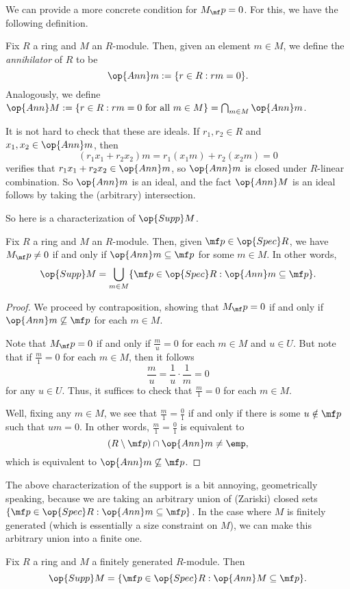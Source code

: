 We can provide a more concrete condition for $M_\mf p=0$. For this, we have the following definition.
\begin{definition}[Annihilator]
	Fix $R$ a ring and $M$ an $R$-module. Then, given an element $m\in M$, we define the \textit{annihilator} of $R$ to be
	\[\op{Ann}m:=\{r\in R:rm=0\}.\]
	Analogously, we define $\op{Ann}M:=\{r\in R:rm=0\text{ for all }m\in M\}=\bigcap_{m\in M}\op{Ann}m$.
\end{definition}
\begin{remark}
	It is not hard to check that these are ideals. If $r_1,r_2\in R$ and $x_1,x_2\in\op{Ann}m$, then
	\[(r_1x_1+r_2x_2)m=r_1(x_1m)+r_2(x_2m)=0\]
	verifies that $r_1x_1+r_2x_2\in\op{Ann}m$, so $\op{Ann}m$ is closed under $R$-linear combination. So $\op{Ann}m$ is an ideal, and the fact $\op{Ann}M$ is an ideal follows by taking the (arbitrary) intersection.
\end{remark}
So here is a characterization of $\op{Supp}M$.
\begin{proposition} \label{prop:generalsupport}
	Fix $R$ a ring and $M$ an $R$-module. Then, given $\mf p\in\op{Spec}R$, we have $M_\mf p\ne0$ if and only if $\op{Ann}m\subseteq\mf p$ for some $m\in M$. In other words,
	\[\op{Supp}M=\bigcup_{m\in M}\{\mf p\in\op{Spec}R:\op{Ann}m\subseteq\mf p\}.\]
\end{proposition}
\begin{proof}
	We proceed by contraposition, showing that $M_\mf p=0$ if and only if $\op{Ann}m\not\subseteq\mf p$ for each $m\in M$.
	
	Note that $M_\mf p=0$ if and only if $\frac mu=0$ for each $m\in M$ and $u\in U$. But note that if $\frac m1=0$ for each $m\in M$, then it follows
	\[\frac mu=\frac1u\cdot\frac1m=0\]
	for any $u\in U$. Thus, it suffices to check that $\frac m1=0$ for each $m\in M$.

	Well, fixing any $m\in M$, we see that $\frac m1=\frac01$ if and only if there is some $u\notin\mf p$ such that $um=0$. In other words, $\frac m1=\frac01$ is equivalent to
	\[(R\setminus\mf p)\cap\op{Ann}m\ne\emp,\]
	which is equivalent to $\op{Ann}m\not\subseteq\mf p$.
\end{proof}
The above characterization of the support is a bit annoying, geometrically speaking, because we are taking an arbitrary union of (Zariski) closed sets $\{\mf p\in\op{Spec}R:\op{Ann}m\subseteq\mf p\}$. In the case where $M$ is finitely generated (which is essentially a size constraint on $M$), we can make this arbitrary union into a finite one.
\begin{proposition} \label{prop:fingensupport}
	Fix $R$ a ring and $M$ a finitely generated $R$-module. Then
	\[\op{Supp}M=\{\mf p\in\op{Spec}R:\op{Ann}M\subseteq\mf p\}.\]
\end{proposition}
